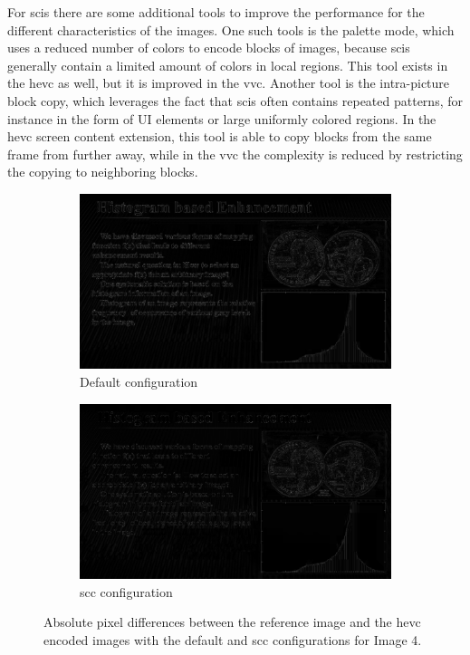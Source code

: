 For \glspl{sci} there are some additional tools to improve the performance for the different characteristics of the images.
One such tools is the palette mode, which uses a reduced number of colors to encode blocks of images, because \glspl{sci} generally contain a limited amount of colors in local regions.
This tool exists in the \gls{hevc} as well, but it is improved in the \gls{vvc}.
Another tool is the intra-picture block copy, which leverages the fact that \glspl{sci} often contains repeated patterns, for instance in the form of UI elements or large uniformly colored regions.
In the \gls{hevc} screen content extension, this tool is able to copy blocks from the same frame from further away, while in the \gls{vvc} the complexity is reduced by restricting the copying to neighboring blocks.
\begin{figure}
    \centering
    \begin{subfigure}[b]{0.45\textwidth}
        \includegraphics[width=\linewidth]{../images/codec_hm_default_diff_50_SCI4.png}
        \caption{Default configuration}
        \label{fig:codec_hm_default_diff_50_SCI4}
    \end{subfigure}
    \hfill
    \begin{subfigure}[b]{0.45\textwidth}
        \includegraphics[width=\linewidth]{../images/codec_hm_scc_diff_50_SCI4.png}
        \caption{\gls{scc} configuration}
        \label{fig:codec_hm_scc_diff_50_SCI4}
    \end{subfigure}
    \caption{Absolute pixel differences between the reference image and the \gls{hevc} encoded images with the default and \gls{scc} configurations for Image 4.}
    \label{fig:codec_hm_diff_50_SCI4}
\end{figure}
